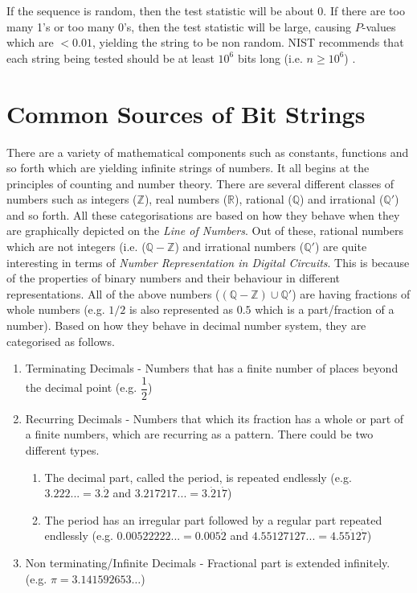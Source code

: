 If the sequence is random, then the test statistic will be about 0. If there are too many 1's or too many 0's, then the test statistic will be large, causing $P$-values which are $<0.01$, yielding the string to be non random. NIST recommends that each string being tested should be at least $10^6$ bits long (i.e. $n\geq10^6$) \cite{rep_nist_sp_80022}.

\section{Common Sources of Bit Strings}

There are a variety of mathematical components such as constants, functions and so forth which are yielding infinite strings of numbers. It all begins at the principles of counting and number theory. There are several different classes of numbers such as integers ($\mathbb{Z}$), real numbers ($\mathbb{R}$), rational ($\mathbb{Q}$) and irrational ($\mathbb{Q}'$) and so forth. All these categorisations are based on how they behave when they are graphically depicted on the \textit{Line of Numbers}. Out of these, rational numbers which are not integers (i.e. ($\mathbb{Q} - \mathbb{Z}$) and irrational numbers ($\mathbb{Q}'$) are quite interesting in terms of \textit{Number Representation in Digital Circuits}. This is because of the properties of binary numbers and their behaviour in different representations. All of the above numbers ($(\mathbb{Q} - \mathbb{Z}) \cup \mathbb{Q}'$) are having fractions of whole numbers (e.g. $1/2$ is also represented as $0.5$ which is a part/fraction of a number). Based on how they behave in decimal number system, they are categorised as follows.

\begin{enumerate}
    \item Terminating Decimals - Numbers that has a finite number of places beyond the decimal point (e.g. $\dfrac{1}{2}$)
    \item Recurring Decimals - Numbers that which its fraction has a whole or part of a finite numbers, which are recurring as a pattern. There could be two different types.
    \begin{enumerate}
        \item The decimal part, called the period, is repeated endlessly (e.g. $3.222...=3.\dot{2}$ and $3.217217...=3.\dot{2}1\dot{7}$)
        \item The period has an irregular part followed by a regular part repeated endlessly (e.g. $0.00522222... = 0.005\dot{2}$ and $4.55127127... = 4.55\dot{1}2\dot{7}$)
    \end{enumerate}
    \item Non terminating/Infinite Decimals - Fractional part is extended infinitely. (e.g. $\pi = 3.141592653\ldots$)
\end{enumerate}

